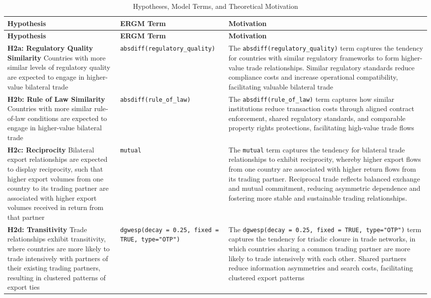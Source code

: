 \documentclass[
]{article}
\begin{document}
\setlength{\arrayrulewidth}{0.05pt}
\begin{longtable}{p{} p{} p{}}
\caption{Hypotheses, Model Terms, and Theoretical Motivation}
\label{tab:hypo_summary} \\
\hline
\textbf{Hypothesis} & \textbf{ERGM Term} & \textbf{Motivation} \\
\hline
\endfirsthead

\hline
\textbf{Hypothesis} & \textbf{ERGM Term} & \textbf{Motivation} \\
\hline
\endhead

\hline
\endfoot

\hline
\endlastfoot

\textbf{H2a: Regulatory Quality Similarity}  
Countries with more similar levels of regulatory quality are expected to engage in higher-value bilateral trade
&
\texttt{absdiff(regulatory\_quality)}
&
The \texttt{absdiff(regulatory\_quality)} term captures the tendency for countries with similar regulatory frameworks to form higher-value trade relationships. Similar regulatory standards reduce compliance costs and increase operational compatibility, facilitating valuable bilateral trade
\\
\hline

\textbf{H2b: Rule of Law Similarity}  
Countries with more similar rule‐of‐law conditions are expected to engage in higher-value bilateral trade
&
\texttt{absdiff(rule\_of\_law)}
&
The \texttt{absdiff(rule\_of\_law)} term captures how similar institutions reduce transaction costs through aligned contract enforcement, shared regulatory standards, and comparable property rights protections, facilitating high-value trade flows
\\
\hline

\textbf{H2c: Reciprocity}  
Bilateral export relationships are expected to display reciprocity, such that higher export volumes from one country to its trading partner are associated with higher export volumes received in return from that partner
&
\texttt{mutual}
&
The \texttt{mutual} term captures the tendency for bilateral trade relationships to exhibit reciprocity, whereby higher export flows from one country are associated with higher return flows from its trading partner. Reciprocal trade reflects balanced exchange and mutual commitment, reducing asymmetric dependence and fostering more stable and sustainable trading relationships.
\\
\hline

\textbf{H2d: Transitivity}  
Trade relationships exhibit transitivity, where countries are more likely to trade intensively with partners of their existing trading partners, resulting in clustered patterns of export ties
&
\texttt{dgwesp(decay = 0.25, fixed = TRUE, type="OTP")}
&
The \texttt{dgwesp(decay = 0.25, fixed = TRUE, type="OTP")} term captures the tendency for triadic closure in trade networks, in which countries sharing a common trading partner are more likely to trade intensively with each other. Shared partners reduce information asymmetries and search costs, facilitating clustered export patterns
\\
\hline


\end{longtable}
\end{document}
